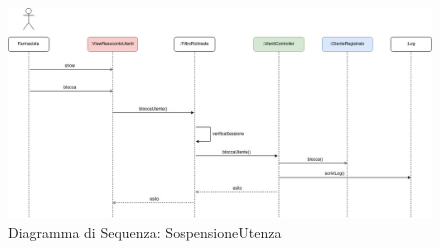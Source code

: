 \newpage

\begin{figure}[h!]
    \begin{center}
        \includegraphics[width=\textwidth]{immagini/Interazione-SospensioneUtenza-progettaz.jpg}
        \caption{Diagramma di Sequenza: SospensioneUtenza}
    \end{center}
\end{figure}

